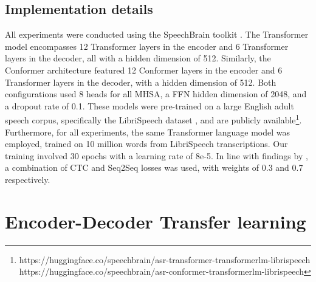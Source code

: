 \subsection{Implementation details}

All experiments were conducted using the SpeechBrain toolkit \cite{speechbrain}. The Transformer model encompasses 12 Transformer layers in the encoder and 6 Transformer layers in the decoder, all with a hidden dimension of 512. Similarly, the Conformer architecture featured 12 Conformer layers in the encoder and 6 Transformer layers in the decoder, with a hidden dimension of 512. Both configurations used 8 heads for all MHSA, a FFN hidden dimension of 2048, and a dropout rate of 0.1. These models were pre-trained on a large English adult speech corpus, specifically the LibriSpeech dataset \cite{librispeech}, and are publicly available\footnote{https://huggingface.co/speechbrain/asr-transformer-transformerlm-librispeech\\ https://huggingface.co/speechbrain/asr-conformer-transformerlm-librispeech}. Furthermore, for all experiments, the same Transformer language model was employed, trained on 10 million words from LibriSpeech transcriptions. Our training involved 30 epochs with a learning rate of 8e-5. In line with findings by \cite{gelin2021endtoend}, a combination of CTC and Seq2Seq losses was used, with weights of 0.3 and 0.7 respectively.




\section{Encoder-Decoder Transfer learning}


